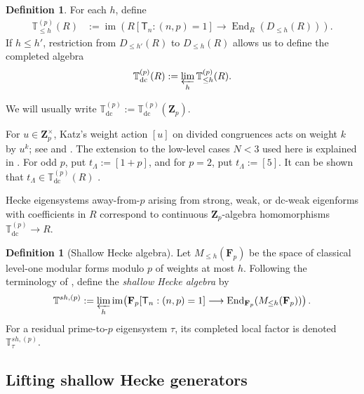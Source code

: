 \documentclass[11pt]{article}
\newcommand{\Z}{\mathbf Z}
\newcommand{\F}{\mathbf F}
\newcommand{\End}{\operatorname{End}}
\theoremstyle{plain}
\theoremstyle{definition}
\newtheorem{definition}[theorem]{Definition}
\theoremstyle{remark}
\numberwithin{equation}{section}
\begin{document}
\begin{definition} \label{def:anemic} 
For each \(h\), define
\begin{equation}
\begin{aligned}
 \mathbb T_{\leq h}^{(p)}(R)
  &:=\operatorname{im}\!\left(
       R[\mathsf T_n:(n,p)=1]\to
      \operatorname{End}_{R}(D_{\leq h}(R))\right).
\end{aligned}
 \label{eq:bounded-anemic}
\end{equation}
If \(h\leq h'\), restriction from \(D_{\leq h'}(R)\) to \(D_{\leq h}(R)\) allows us to define the completed algebra \begin{equation}  \mathbb T_{\mathrm{dc}}^{(p)}(R)    :=\varprojlim_h\mathbb T_{\leq h}^{(p)}(R).  \label{eq:complete-anemic} \end{equation}
\end{definition}

We will usually write $\mathbb T_{\mathrm{dc}}^{(p)}:=\mathbb T_{\mathrm{dc}}^{(p)}(\Z_p)$.

For \(u\in\mathbf Z_p^\times\), Katz's weight action \([u]\) on divided congruences acts on weight \(k\) by \(u^k\); see \cite[(2.4)]{Katz1975a} and \cite[\S X]{Katz1975b}.  The extension to the low-level cases \(N<3\) used here is explained in \cite[Theorem~2.2 and the following paragraph]{Rustom2019}. For odd \(p\), put \(t_\Lambda:=[1+p]\), and for \(p=2\), put \(t_\Lambda:=[5]\).  It can be shown that $t_\Lambda \in \mathbb T_{\mathrm{dc}}^{(p)}(R)$ \cite[Lemma 9]{BellaicheKhare2015}.

Hecke eigensystems away-from-$p$ arising from strong, weak, or dc-weak eigenforms with coefficients in $R$ correspond to continuous $\Z_p$-algebra homomorphisms $\mathbb T_{\mathrm{dc}}^{(p)} \rightarrow R$.

\begin{definition}[Shallow Hecke algebra]
\label{def:shallow}
Let \(M_{\leq h}(\F_p)\) be the space of classical level-one modular
forms modulo \(p\) of weights at most \(h\).  Following the terminology
of \cite[\S1.2]{BellaicheKhare2015}, define the \emph{shallow Hecke
algebra} by
\[
\mathbb T^{sh,(p)}
:=\varprojlim_h\operatorname{im}\!\left(
\F_p[\mathsf T_n:(n,p)=1]
\longrightarrow\End_{\F_p}(M_{\leq h}(\F_p))\right).
\]
For a
residual prime-to-\(p\) eigensystem \(\tau\), its completed local factor is denoted \(\mathbb T^{sh,(p)}_\tau\).
\end{definition}

\subsection{Lifting shallow Hecke generators}
\end{document}
